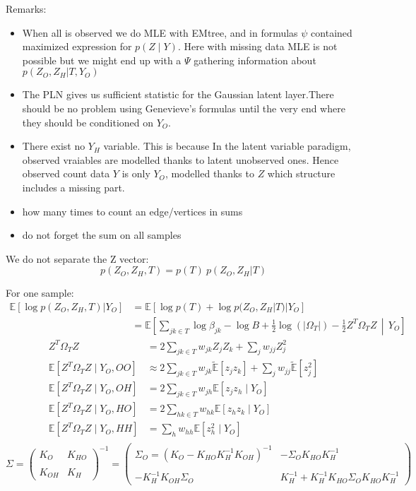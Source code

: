 \documentclass[11pt,a4paper]{article}
\newcommand{\Esp}{\mathds{E}}
\begin{document}
Remarks:
\begin{itemize}
\item When all is observed we do MLE with EMtree, and in formulas $\psi$ contained maximized expression for $p(Z \mid Y)$. Here with missing data MLE is not possible but we might end up with a $\Psi$ gathering information about $ p(Z_O,Z_H|T,Y_O)$
\item The PLN gives us sufficient statistic for the Gaussian latent layer.There should be no problem using Genevieve's formulas until the very end where they should be conditioned on $Y_O$.
\item There exist no $Y_H$ variable. This is because In the latent variable paradigm, observed vraiables are modelled thanks to latent unobserved ones. Hence observed count data $Y$ is only $Y_O$, modelled thanks to $Z$ which structure includes a  missing part.
\item how many times to count an edge/vertices in sums 
\item do not forget the sum on all samples
\end{itemize}



We do not separate the Z vector:
$$p(Z_O,Z_H,T) = p(T) \: p(Z_O,Z_H|T)$$

For one sample:
\begin{align*}
 \Esp[\log p(Z_O,Z_H,T) | Y_O ] &=  \Esp[\log p(T)+\log p(Z_O,Z_H|T)|Y_O] \\
  &=\Esp\left[\sum_{jk \in T} \log \beta_{jk} - \log B + \frac{1}{2} \log(|\Omega_T|) - \frac{1}{2} Z^T \Omega_T Z\,\middle\vert\,  Y_O\right]
\end{align*} 
\begin{align*}
Z^T \Omega_T Z &= 2 \sum_{jk \in T} w_{jk} Z_j Z_k + \sum_j w_{jj}Z^2_j \\
\Esp[Z^T \Omega_T Z \mid Y_O, OO] & \approx 2\sum_{jk \in T} w_{jk} \tilde{\Esp}[z_jz_k] + \sum_j w_{jj}\tilde{\Esp}[z_j^2]\\
\Esp[Z^T \Omega_T Z \mid Y_O, OH] & = 2\sum_{jk \in T} w_{jh} \Esp[z_jz_h \mid Y_O] \\
\Esp[Z^T \Omega_T Z \mid Y_O, HO] &=  2\sum_{hk \in T} w_{hk}  \Esp[z_hz_k \mid Y_O]\\
\Esp[Z^T \Omega_T Z \mid Y_O, HH] &= \sum_h w_{hh} \Esp[z_h^2 \mid Y_O]\\
\end{align*} 
\[
 \Sigma=
  \left( {\begin{array}{cc}
  K_O &  K_{HO}\\\\
  K_{OH} & K_H
  \end{array} } \right)^{-1} =
  \left( {\begin{array}{cc}
  \Sigma_O =( K_O - K_{HO}K_H^{-1}K_{OH})^{-1} &  - \Sigma_O K_{HO}K_H^{-1}\\\\
 -K_H^{-1}K_{OH}\Sigma_O & K_H^{-1}+K_H^{-1}K_{HO}\Sigma_OK_{HO}K_H^{-1}
  \end{array} } \right)
  \]
  
\end{document}
